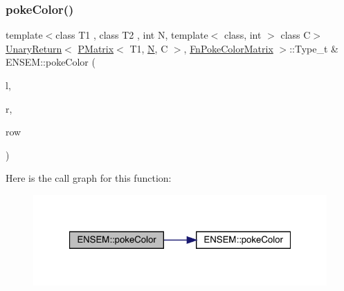 \subsubsection{\texorpdfstring{pokeColor()}{pokeColor()}\hspace{0.1cm}{\footnotesize\ttfamily [1/2]}}
{\footnotesize\ttfamily template$<$class T1 , class T2 , int N, template$<$ class, int $>$ class C$>$ \\
\mbox{\hyperlink{structENSEM_1_1UnaryReturn}{Unary\+Return}}$<$ \mbox{\hyperlink{classENSEM_1_1PMatrix}{P\+Matrix}}$<$ T1, \mbox{\hyperlink{adat__devel_2lib_2hadron_2operator__name__util_8cc_a7722c8ecbb62d99aee7ce68b1752f337}{N}}, C $>$, \mbox{\hyperlink{structENSEM_1_1FnPokeColorMatrix}{Fn\+Poke\+Color\+Matrix}} $>$\+::Type\+\_\+t \& E\+N\+S\+E\+M\+::poke\+Color (\begin{DoxyParamCaption}\item[{\mbox{\hyperlink{classENSEM_1_1PMatrix}{P\+Matrix}}$<$ T1, \mbox{\hyperlink{adat__devel_2lib_2hadron_2operator__name__util_8cc_a7722c8ecbb62d99aee7ce68b1752f337}{N}}, C $>$ \&}]{l,  }\item[{const \mbox{\hyperlink{classENSEM_1_1PMatrix}{P\+Matrix}}$<$ T2, \mbox{\hyperlink{adat__devel_2lib_2hadron_2operator__name__util_8cc_a7722c8ecbb62d99aee7ce68b1752f337}{N}}, C $>$ \&}]{r,  }\item[{int}]{row }\end{DoxyParamCaption})\hspace{0.3cm}{\ttfamily [inline]}}

Here is the call graph for this function\+:\nopagebreak
\begin{figure}[H]
\begin{center}
\leavevmode
\includegraphics[width=321pt]{df/d0a/group__primmatrix_ga0cfeefefe2bd8b4e365ac10d8853664a_cgraph}
\end{center}
\end{figure}
\mbox{\label{group__primmatrix_gab840db69dc60bcb095f46b69353d09f3}} 
